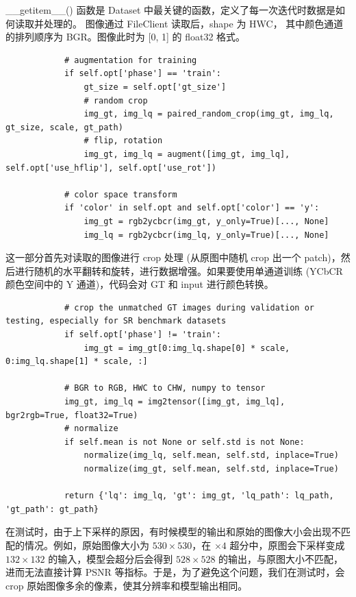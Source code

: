 \documentclass[../main.tex]{subfiles}
\begin{document}
\_\_getitem\_\_() 函数是 Dataset 中最关键的函数，定义了每一次迭代时数据是如何读取并处理的。 图像通过 FileClient 读取后，shape 为 HWC， 其中颜色通道的排列顺序为 BGR。图像此时为 [0, 1] 的 float32 格式。

\begin{verbatim}
            # augmentation for training
            if self.opt['phase'] == 'train':
                gt_size = self.opt['gt_size']
                # random crop
                img_gt, img_lq = paired_random_crop(img_gt, img_lq, gt_size, scale, gt_path)
                # flip, rotation
                img_gt, img_lq = augment([img_gt, img_lq], self.opt['use_hflip'], self.opt['use_rot'])

            # color space transform
            if 'color' in self.opt and self.opt['color'] == 'y':
                img_gt = rgb2ycbcr(img_gt, y_only=True)[..., None]
                img_lq = rgb2ycbcr(img_lq, y_only=True)[..., None]
    \end{verbatim}

这一部分首先对读取的图像进行 crop 处理 (从原图中随机 crop 出一个 patch)，然后进行随机的水平翻转和旋转，进行数据增强。如果要使用单通道训练 (YCbCR 颜色空间中的 Y 通道)，代码会对 GT 和 input 进行颜色转换。

\begin{verbatim}
            # crop the unmatched GT images during validation or testing, especially for SR benchmark datasets
            if self.opt['phase'] != 'train':
                img_gt = img_gt[0:img_lq.shape[0] * scale, 0:img_lq.shape[1] * scale, :]

            # BGR to RGB, HWC to CHW, numpy to tensor
            img_gt, img_lq = img2tensor([img_gt, img_lq], bgr2rgb=True, float32=True)
            # normalize
            if self.mean is not None or self.std is not None:
                normalize(img_lq, self.mean, self.std, inplace=True)
                normalize(img_gt, self.mean, self.std, inplace=True)

            return {'lq': img_lq, 'gt': img_gt, 'lq_path': lq_path, 'gt_path': gt_path}
    \end{verbatim}

在测试时，由于上下采样的原因，有时候模型的输出和原始的图像大小会出现不匹配的情况。例如，原始图像大小为 $530 \times 530$，在 $\times 4$  超分中，原图会下采样变成 $132 \times 132$ 的输入，模型会超分后会得到 $528 \times 528$ 的输出，与原图大小不匹配，进而无法直接计算 PSNR 等指标。于是，为了避免这个问题，我们在测试时，会 crop 原始图像多余的像素，使其分辨率和模型输出相同。
\end{document}
